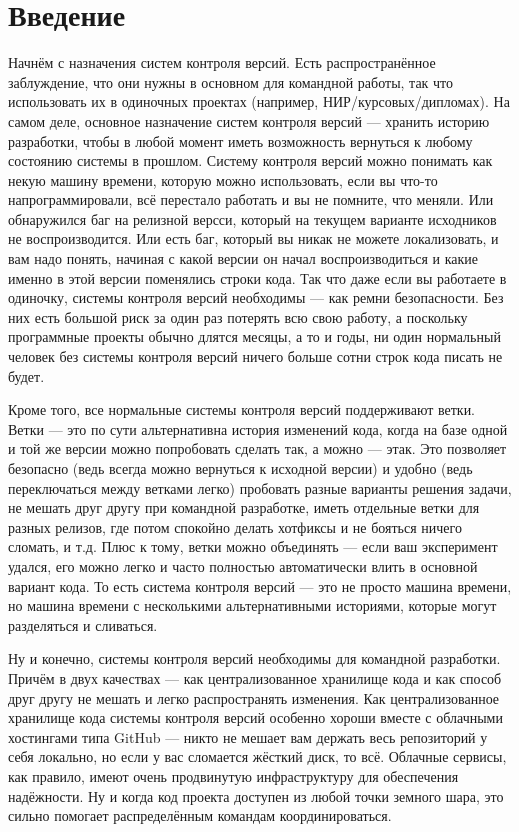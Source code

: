 \documentclass{../../text-style}
\begin{document}
\maketitle
\thispagestyle{empty}

\section{Введение}

Начнём с назначения систем контроля версий. Есть распространённое заблуждение, что они нужны в основном для командной работы, так что использовать их в одиночных проектах (например, НИР/курсовых/дипломах). На самом деле, основное назначение систем контроля версий --- хранить историю разработки, чтобы в любой момент иметь возможность вернуться к любому состоянию системы в прошлом. Систему контроля версий можно понимать как некую машину времени, которую можно использовать, если вы что-то напрограммировали, всё перестало работать и вы не помните, что меняли. Или обнаружился баг на релизной версси, который на текущем варианте исходников не воспроизводится. Или есть баг, который вы никак не можете локализовать, и вам надо понять, начиная с какой версии он начал воспроизводиться и какие именно в этой версии поменялись строки кода. Так что даже если вы работаете в одиночку, системы контроля версий необходимы --- как ремни безопасности. Без них есть большой риск за один раз потерять всю свою работу, а поскольку программные проекты обычно длятся месяцы, а то и годы, ни один нормальный человек без системы контроля версий ничего больше сотни строк кода писать не будет.

Кроме того, все нормальные системы контроля версий поддерживают ветки. Ветки --- это по сути альтернативна история изменений кода, когда на базе одной и той же версии можно попробовать сделать так, а можно --- этак. Это позволяет безопасно (ведь всегда можно вернуться к исходной версии) и удобно (ведь переключаться между ветками легко) пробовать разные варианты решения задачи, не мешать друг другу при командной разработке, иметь отдельные ветки для разных релизов, где потом спокойно делать хотфиксы и не бояться ничего сломать, и т.д. Плюс к тому, ветки можно объединять --- если ваш эксперимент удался, его можно легко и часто полностью автоматически влить в основной вариант кода. То есть система контроля версий --- это не просто машина времени, но машина времени с несколькими альтернативными историями, которые могут разделяться и сливаться.

Ну и конечно, системы контроля версий необходимы для командной разработки. Причём в двух качествах --- как централизованное хранилище кода и как способ друг другу не мешать и легко распространять изменения. Как централизованное хранилище кода системы контроля версий особенно хороши вместе с облачными хостингами типа GitHub --- никто не мешает вам держать весь репозиторий у себя локально, но если у вас сломается жёсткий диск, то всё. Облачные сервисы, как правило, имеют очень продвинутую инфраструктуру для обеспечения надёжности. Ну и когда код проекта доступен из любой точки земного шара, это сильно помогает распределённым командам координироваться.
\end{document}
